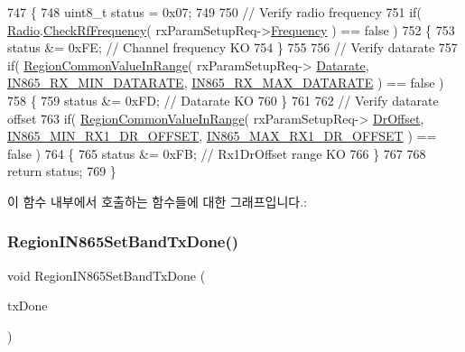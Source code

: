 \begin{DoxyCode}
747 \{
748     uint8\_t status = 0x07;
749 
750     \textcolor{comment}{// Verify radio frequency}
751     \textcolor{keywordflow}{if}( \mbox{\hyperlink{sx1276mb1las_8c_acf9fe61a72c16fa29a0dc449d23e3820}{Radio}}.\mbox{\hyperlink{struct_radio__s_a984f224d5ef26fb8a35f77d664f384df}{CheckRfFrequency}}( rxParamSetupReq->\mbox{\hyperlink{structs_rx_param_setup_req_params_ade3d190636488dad9a89b19446b7acf1}{Frequency}} ) == false )
752     \{
753         status &= 0xFE; \textcolor{comment}{// Channel frequency KO}
754     \}
755 
756     \textcolor{comment}{// Verify datarate}
757     \textcolor{keywordflow}{if}( \mbox{\hyperlink{group___r_e_g_i_o_n_c_o_m_m_o_n_gafdd1c80d953e18d755a631b72a9c3bd3}{RegionCommonValueInRange}}( rxParamSetupReq->
      \mbox{\hyperlink{structs_rx_param_setup_req_params_ae2f6080f3aa0e9485c55513ca56bb24d}{Datarate}}, \mbox{\hyperlink{group___r_e_g_i_o_n_i_n865_ga59fe5dabb4cddd00deb343648d18e8cc}{IN865\_RX\_MIN\_DATARATE}}, 
      \mbox{\hyperlink{group___r_e_g_i_o_n_i_n865_gac1653eb95c60570e630c485302a8c2af}{IN865\_RX\_MAX\_DATARATE}} ) == false )
758     \{
759         status &= 0xFD; \textcolor{comment}{// Datarate KO}
760     \}
761 
762     \textcolor{comment}{// Verify datarate offset}
763     \textcolor{keywordflow}{if}( \mbox{\hyperlink{group___r_e_g_i_o_n_c_o_m_m_o_n_gafdd1c80d953e18d755a631b72a9c3bd3}{RegionCommonValueInRange}}( rxParamSetupReq->
      \mbox{\hyperlink{structs_rx_param_setup_req_params_ad920e18a48423b1eb1fe40d1b2b082d4}{DrOffset}}, \mbox{\hyperlink{group___r_e_g_i_o_n_i_n865_ga898979e964849e97c76ef8417bf69990}{IN865\_MIN\_RX1\_DR\_OFFSET}}, 
      \mbox{\hyperlink{group___r_e_g_i_o_n_i_n865_ga3211339c60a66ca9f9baad03eb4546d6}{IN865\_MAX\_RX1\_DR\_OFFSET}} ) == false )
764     \{
765         status &= 0xFB; \textcolor{comment}{// Rx1DrOffset range KO}
766     \}
767 
768     \textcolor{keywordflow}{return} status;
769 \}
\end{DoxyCode}
이 함수 내부에서 호출하는 함수들에 대한 그래프입니다.\+:
\mbox{\label{group___r_e_g_i_o_n_i_n865_ga328c341535bded76103e52c4e4c685fe}} 
\subsubsection{\texorpdfstring{Region\+I\+N865\+Set\+Band\+Tx\+Done()}{RegionIN865SetBandTxDone()}}
{\footnotesize\ttfamily void Region\+I\+N865\+Set\+Band\+Tx\+Done (\begin{DoxyParamCaption}\item[{\mbox{\hyperlink{group___r_e_g_i_o_n_gad0524aa0673c0814a71e7a4f9cade3fc}{Set\+Band\+Tx\+Done\+Params\+\_\+t}} $\ast$}]{tx\+Done }\end{DoxyParamCaption})}



